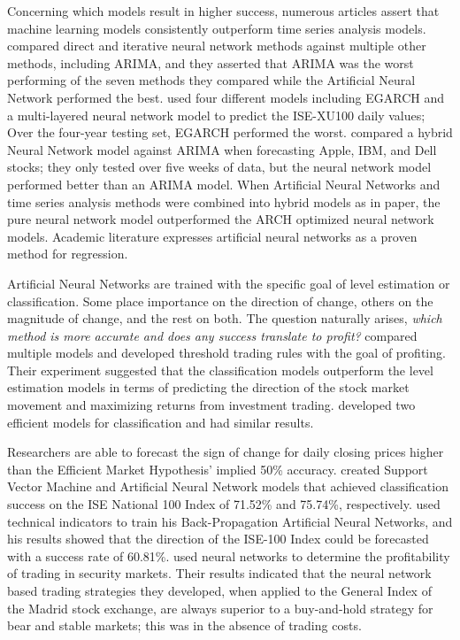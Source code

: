 \documentclass{ncjms}
\begin{document}
	Concerning which models result in higher success, numerous articles assert that machine learning models consistently outperform time series analysis models.
	\citet{Hamzacebi:2009} compared direct and iterative neural network methods against multiple other methods, including ARIMA, and they asserted that ARIMA was the worst performing of the seven methods they compared while the Artificial Neural Network performed the best.
	\citet{Yumlu:2005} used four different models including EGARCH and a multi-layered neural network model to predict the ISE-XU100 daily values; Over the four-year testing set, EGARCH performed the worst.
	\citet{Hassan:2007} compared a hybrid Neural Network model against ARIMA when forecasting Apple, IBM, and Dell stocks; they only tested over five weeks of data, but the neural network model performed better than an ARIMA model.
	When Artificial Neural Networks and time series analysis methods were combined into hybrid models as in \citet{Hyup:2007} paper, the pure neural network model outperformed the ARCH optimized neural network models.
	Academic literature expresses artificial neural networks as a proven method for regression.

	Artificial Neural Networks are trained with the specific goal of level estimation or classification.
	Some place importance on the direction of change, others on the magnitude of change, and the rest on both.
	The question naturally arises, \textit{which method is more accurate and does any success translate to profit?}
	\citet{Leung:2000} compared multiple models and developed threshold trading rules with the goal of profiting.
	Their experiment suggested that the classification models outperform the level estimation models in terms of predicting the direction of the stock market movement and maximizing returns from investment trading.
	\citet{Kara:2011} developed two efficient models for classification and had similar results.

	Researchers are able to forecast the sign of change for daily closing prices higher than the Efficient Market Hypothesis' implied 50\% accuracy.
	\citet{Kara:2011} created Support Vector Machine and Artificial Neural Network models that achieved classification success on the ISE National 100 Index of 71.52\% and 75.74\%, respectively.
	\citet{Diler:2003} used technical indicators to train his Back-Propagation Artificial Neural Networks, and his results showed that the direction of the ISE-100 Index could be forecasted with a success rate of 60.81\%.
	\citet{Fernandez:2000} used neural networks to determine the profitability of trading in security markets.
	Their results indicated that the neural network based trading strategies they developed, when applied to the General Index of the Madrid stock exchange, are always superior to a buy-and-hold strategy for bear and stable markets; this was in the absence of trading costs.
\end{document}
